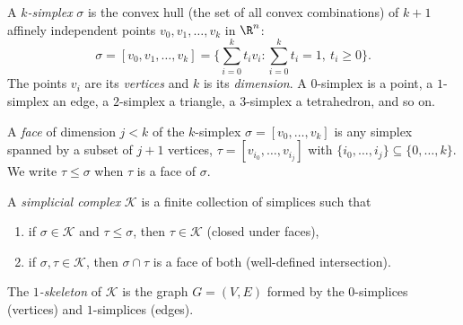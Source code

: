 \begin{definition}[$k$-simplex]
\label{def:graphs:simplex}
A \emph{$k$-simplex} $\sigma$ is the convex hull (the set of all convex
combinations) of $k+1$ affinely independent points $v_0, v_1, \dots, v_k$ in
$\R^n$:
\[
  \sigma = [v_0, v_1, \dots, v_k]
    = \Big\{ \textstyle\sum_{i=0}^k t_i v_i : \sum_{i=0}^k t_i = 1,\ t_i \ge 0 \Big\}.
\]
The points $v_i$ are its \emph{vertices} and $k$ is its \emph{dimension}. A
$0$-simplex is a point, a $1$-simplex an edge, a $2$-simplex a triangle, a
$3$-simplex a tetrahedron, and so on.
\end{definition}

\begin{definition}
\label{def:graphs:face}
A \emph{face} of dimension $j < k$ of the $k$-simplex
$\sigma = [v_0, \dots, v_k]$ is any simplex spanned by a subset of $j+1$
vertices, $\tau = [v_{i_0}, \dots, v_{i_j}]$ with
$\{i_0, \dots, i_j\} \subseteq \{0, \dots, k\}$. We write $\tau \le \sigma$ when
$\tau$ is a face of $\sigma$.
\end{definition}

\begin{definition}
\label{def:graphs:complex}
A \emph{simplicial complex} $\mathcal{K}$ is a finite collection of simplices
such that
\begin{enumerate}
  \item if $\sigma \in \mathcal{K}$ and $\tau \le \sigma$, then
        $\tau \in \mathcal{K}$ (closed under faces),
  \item if $\sigma, \tau \in \mathcal{K}$, then $\sigma \cap \tau$ is a face of
        both (well-defined intersection).
\end{enumerate}
The \emph{$1$-skeleton} of $\mathcal{K}$ is the graph $G = (V, E)$ formed by the
$0$-simplices (vertices) and $1$-simplices (edges).
\end{definition}

